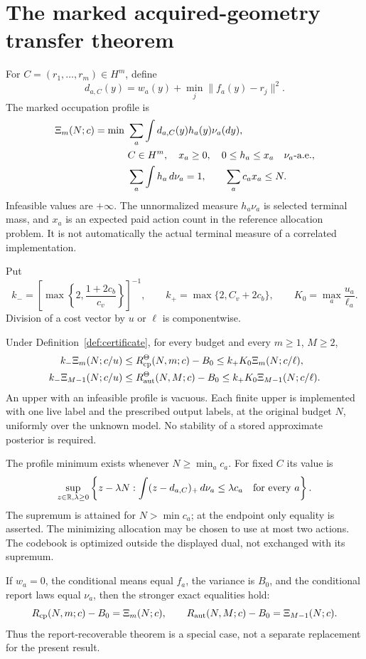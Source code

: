 \section{The marked acquired-geometry transfer theorem}
\label{sec:central}
For $C=(r_1,\ldots,r_m)\in H^m$, define
\[
 d_{a,C}(y)=w_a(y)+\min_j\|f_a(y)-r_j\|^2.
\]
The marked occupation profile is
\begin{align}
 \Xi_m(N;c)=\min\ &\sum_a\int d_{a,C}(y)h_a(y)\nu_a(dy),\label{eq:marked-profile}\\
 &C\in H^m,\quad x_a\ge0,\quad0\le h_a\le x_a\quad\nu_a\text{-a.e.},\notag\\
 &\sum_a\int h_a\,d\nu_a=1,\qquad \sum_ac_ax_a\le N.\notag
\end{align}
Infeasible values are $+\infty$. The unnormalized measure $h_a\nu_a$ is selected terminal mass, and $x_a$ is an expected paid action count in the reference allocation problem. It is not automatically the actual terminal measure of a correlated implementation.

Put
\[
 k_- =\left[\max\left\{2,\frac{1+2c_b}{c_v}\right\}\right]^{-1},
 \qquad k_+=\max\{2,C_v+2c_b\},\qquad
 K_0=\max_a\frac{u_a}{\ell_a}.
\]
Division of a cost vector by $u$ or $\ell$ is componentwise.

\begin{theorem}\label{thm:central}
Under Definition~\ref{def:certificate}, for every budget and every $m\ge1$, $M\ge2$,
\begin{align}
 k_-\Xi_m(N;c/u)
 &\le R_{\mathrm{cp}}^\Theta(N,m;c)-B_0
 \le k_+K_0\Xi_m(N;c/\ell),\label{eq:cp-transfer}\\
 k_-\Xi_{M-1}(N;c/u)
 &\le R_{\mathrm{aut}}^\Theta(N,M;c)-B_0
 \le k_+K_0\Xi_{M-1}(N;c/\ell).\label{eq:aut-transfer}
\end{align}
An upper with an infeasible profile is vacuous. Each finite upper is implemented with one live label and the prescribed output labels, at the original budget $N$, uniformly over the unknown model. No stability of a stored approximate posterior is required.

The profile minimum exists whenever $N\ge\min_a c_a$. For fixed $C$ its value is
\begin{equation}\label{eq:dual}
 \sup_{z\in\mathbb R,\lambda\ge0}\left\{z-\lambda N:
       \int(z-d_{a,C})_+\,d\nu_a\le\lambda c_a\quad\text{for every }a\right\}.
\end{equation}
The supremum is attained for $N>\min c_a$; at the endpoint only equality is asserted. The minimizing allocation may be chosen to use at most two actions. The codebook is optimized outside the displayed dual, not exchanged with its supremum.

If $w_a=0$, the conditional means equal $f_a$, the variance is $B_0$, and the conditional report laws equal $\nu_a$, then the stronger exact equalities hold:
\[
 R_{\mathrm{cp}}(N,m;c)-B_0=\Xi_m(N;c),\qquad
 R_{\mathrm{aut}}(N,M;c)-B_0=\Xi_{M-1}(N;c).
\]
Thus the report-recoverable theorem is a special case, not a separate replacement for the present result.
\end{theorem}

